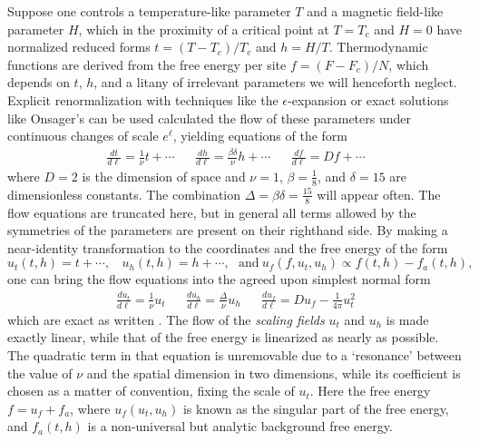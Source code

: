 \documentclass[
aps,
pre,
preprint,
longbibliography,
floatfix
]{revtex4-2}
\begin{document}
Suppose one controls a temperature-like parameter $T$ and a magnetic field-like
parameter $H$, which in the proximity of a critical point at $T=T_c$ and $H=0$
have normalized reduced forms $t=(T-T_c)/T_c$ and $h=H/T$. Thermodynamic
functions are derived from the free energy per site $f=(F-F_c)/N$, which
depends on $t$, $h$, and a litany of irrelevant parameters we will henceforth
neglect.  Explicit renormalization with techniques like the
$\epsilon$-expansion or exact solutions like Onsager's can be used calculated
the flow of these parameters under continuous changes of scale $e^\ell$,
yielding equations of the form
\begin{align} \label{eq:raw.flow}
  \frac{dt}{d\ell}=\frac1\nu t+\cdots
  &&
  \frac{dh}{d\ell}=\frac{\beta\delta}\nu h+\cdots
  &&
  \frac{df}{d\ell}=Df+\cdots
\end{align}
where $D=2$ is the dimension of space and $\nu=1$, $\beta=\frac18$, and
$\delta=15$ are dimensionless constants. The combination
$\Delta=\beta\delta=\frac{15}8$ will appear often. The flow equations are
truncated here, but in general all terms allowed by the symmetries of the
parameters are present on their righthand side. By making a near-identity
transformation to the coordinates and the free energy of the form
\begin{equation}
    \label{eq:AnalyticCOV}
u_t(t,h)=t+\cdots, ~~~~u_h(t, h)=h+\cdots,~~~\mathrm{and}~u_f(f,u_t,u_h)\propto f(t,h)-f_a(t,h),
\end{equation}
one can bring
the flow equations into the agreed upon simplest normal form
\begin{align} \label{eq:flow}
  \frac{du_t}{d\ell}=\frac1\nu u_t
  &&
  \frac{du_h}{d\ell}=\frac{\Delta}\nu u_h
  &&
  \frac{du_f}{d\ell}=Du_f-\frac1{4\pi}u_t^2
\end{align}
which are exact as written \cite{Raju_2019_Normal}. The flow of the
\emph{scaling fields} $u_t$ and $u_h$ is made exactly linear, while that of the
free energy is linearized as nearly as possible. The quadratic term in that
equation is unremovable due to a `resonance' between the value of $\nu$ and the
spatial dimension in two dimensions, while its coefficient is chosen as a
matter of convention, fixing the scale of $u_t$. Here the free energy $f=u_f+f_a$, where $u_f(u_t,u_h)$ is known as the singular part of the free energy, and $f_a(t,h)$ is a non-universal but analytic background free energy.
\end{document}
